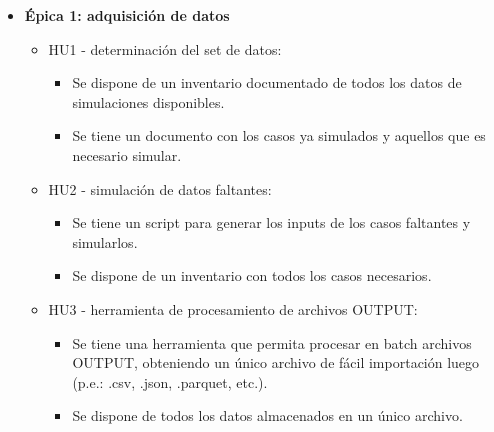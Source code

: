 \documentclass[
11pt, %
]{charter}
\begin{document}
\begin{itemize}
  \item \textbf{Épica 1: adquisición de datos}
    \begin{itemize}
      \item HU1 - determinación del set de datos:
        \begin{itemize}
          \item Se dispone de un inventario documentado de todos los datos de simulaciones disponibles.
          \item Se tiene un documento con los casos ya simulados y aquellos que es necesario simular.
        \end{itemize}
      \item HU2 - simulación de datos faltantes:
        \begin{itemize}
          \item Se tiene un script para generar los inputs de los casos faltantes y simularlos.
          \item Se dispone de un inventario con todos los casos necesarios.
        \end{itemize}
      \item HU3 - herramienta de procesamiento de archivos OUTPUT:
        \begin{itemize}
          \item Se tiene una herramienta que permita procesar en batch archivos OUTPUT, obteniendo un único archivo de fácil importación luego (p.e.: .csv, .json, .parquet, etc.).
          \item Se dispone de todos los datos almacenados en un único archivo.
        \end{itemize}
    \end{itemize}

\end{itemize}
\end{document}
